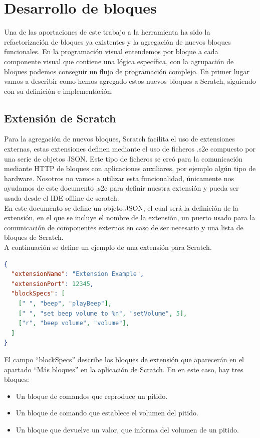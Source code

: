 \section{Desarrollo de bloques}
\label{sec:desarrollo-de-bloques}

Una de las aportaciones de este trabajo a la herramienta ha sido la refactorización de bloques ya existentes y la agregación de nuevos bloques funcionales. En la programación visual entendemos por bloque a cada componente visual que contiene una lógica específica, con la agrupación de bloques podemos conseguir un flujo de programación complejo. En primer lugar vamos a describir como hemos agregado estos nuevos bloques a Scratch, siguiendo con su definición e implementación.

\subsection{Extensión de Scratch}

Para la agregación de nuevos bloques, Scratch facilita el uso de extensiones externas, estas  extensiones definen mediante el uso de ficheros .s2e compuesto por una serie de objetos JSON. Este tipo de ficheros se creó para la comunicación mediante HTTP de bloques con aplicaciones auxiliares, por ejemplo algún tipo de hardware. Nosotros no vamos a utilizar esta funcionalidad, únicamente nos ayudamos de este documento .s2e para definir nuestra extensión y pueda ser usada desde el IDE offline de scratch.\\

En este documento se define un objeto JSON, el cual será la definición de la extensión, en el que se incluye el nombre de la extensión, un puerto usado para la comunicación de componentes externos en caso de ser necesario y una lista de bloques de Scratch. \\

A continuación se define un ejemplo de una extensión para Scratch. 
\begin{lstlisting}[language=json,firstnumber=1]
{ 
  "extensionName": "Extension Example",
  "extensionPort": 12345,
  "blockSpecs": [
    [" ", "beep", "playBeep"],
	[" ", "set beep volume to %n", "setVolume", 5],
	["r", "beep volume", "volume"],
  ]
}
\end{lstlisting}

El campo ``blockSpecs'' describe los bloques de extensión que aparecerán en el apartado ``Más bloques'' en la aplicación de Scratch.
En en este caso, hay tres bloques:
\begin{itemize}
\item Un bloque de comandos que reproduce un pitido.
\item Un bloque de comando que
establece el volumen del pitido.
\item Un bloque que devuelve un valor, que informa del volumen de un pitido.
\end{itemize}

